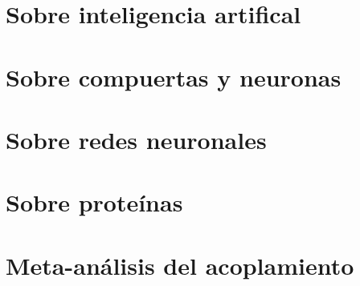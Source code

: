 \documentclass[letterpaper,12pt]{book}
\begin{document}
\frontmatter
    
    \tableofcontents
    

\mainmatter
    \chapter{Sobre inteligencia artifical}
        
    \chapter{Sobre compuertas y neuronas}
        
    \chapter{Sobre redes neuronales}
        
    \chapter{Sobre proteínas}
        
    \chapter{Meta-análisis del acoplamiento}
        




\backmatter
    \nocite{*}
    \printbibliography
\end{document}

